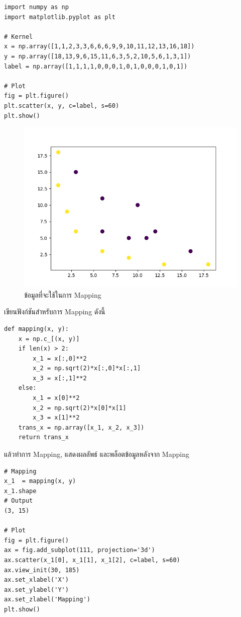 \begin{lstlisting}[style=MyPython]
import numpy as np
import matplotlib.pyplot as plt

# Kernel
x = np.array([1,1,2,3,3,6,6,6,9,9,10,11,12,13,16,18])
y = np.array([18,13,9,6,15,11,6,3,5,2,10,5,6,1,3,1])
label = np.array([1,1,1,1,0,0,0,1,0,1,0,0,0,1,0,1])

# Plot
fig = plt.figure()
plt.scatter(x, y, c=label, s=60)
plt.show()
\end{lstlisting}

\begin{figure}[H]
    \centering
    \includegraphics[width=0.9\linewidth]{fig/kernel_data.png}
    \caption{ข้อมูลที่จะใช้ในการ Mapping}
    \label{fig:kernel_data}
\end{figure}

\vspace{1em}
\noindent เขียนฟังก์ชันสำหรับการ Mapping ดังนี้

\begin{lstlisting}[style=MyPython]
def mapping(x, y):    
	x = np.c_[(x, y)]				
    if len(x) >	2:        
    	x_1 = x[:,0]**2        
        x_2 = np.sqrt(2)*x[:,0]*x[:,1]        
        x_3 = x[:,1]**2								
    else:            
    	x_1 = x[0]**2        
        x_2 = np.sqrt(2)*x[0]*x[1]        
        x_3 = x[1]**2			    
    trans_x = np.array([x_1, x_2, x_3])				
    return trans_x	
\end{lstlisting}

\vspace{1em}
\noindent แล้วทำการ Mapping, แสดงผลลัพธ์ และพล็อตข้อมูลหลังจาก Mapping

\begin{lstlisting}[style=MyPython]
# Mapping
x_1  = mapping(x, y)
x_1.shape
# Output
(3, 15)

# Plot
fig = plt.figure()
ax = fig.add_subplot(111, projection='3d')
ax.scatter(x_1[0], x_1[1], x_1[2], c=label, s=60)
ax.view_init(30, 185)
ax.set_xlabel('X')
ax.set_ylabel('Y')
ax.set_zlabel('Mapping')
plt.show()
\end{lstlisting}

